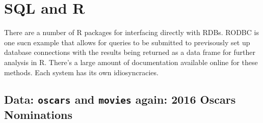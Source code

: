 \documentclass[]{book}
\theoremstyle{definition}
\theoremstyle{definition}
\theoremstyle{definition}
\theoremstyle{remark}
\begin{document}
\section{SQL and R}\label{sql-and-r}

There are a number of R packages for interfacing directly with RDBs.
RODBC is one sucn example that allows for queries to be submitted to
previsously set up database connections with the results being returned
as a data frame for further analysis in R. There's a large amount of
documentation available online for these methods. Each system has its
own idiosyncracies.

\subsection{\texorpdfstring{Data: \texttt{oscars} and \texttt{movies}
again: 2016 Oscars
Nominations}{Data: oscars and movies again: 2016 Oscars Nominations}}\label{data-oscars-and-movies-again-2016-oscars-nominations}
\end{document}
